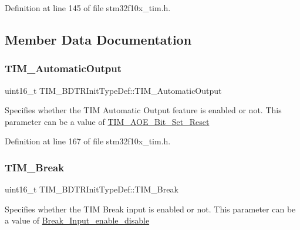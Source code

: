 Definition at line 145 of file stm32f10x\+\_\+tim.\+h.



\subsection{Member Data Documentation}
\mbox{\label{struct_t_i_m___b_d_t_r_init_type_def_a6c056e29af67fd8a32919104ea48eea2}} 
\subsubsection{\texorpdfstring{T\+I\+M\+\_\+\+Automatic\+Output}{TIM\_AutomaticOutput}}
{\footnotesize\ttfamily uint16\+\_\+t T\+I\+M\+\_\+\+B\+D\+T\+R\+Init\+Type\+Def\+::\+T\+I\+M\+\_\+\+Automatic\+Output}

Specifies whether the T\+IM Automatic Output feature is enabled or not. This parameter can be a value of \hyperlink{group___t_i_m___a_o_e___bit___set___reset}{T\+I\+M\+\_\+\+A\+O\+E\+\_\+\+Bit\+\_\+\+Set\+\_\+\+Reset} 

Definition at line 167 of file stm32f10x\+\_\+tim.\+h.

\mbox{\label{struct_t_i_m___b_d_t_r_init_type_def_a9fcf20632d0377727476a98f7183be56}} 
\subsubsection{\texorpdfstring{T\+I\+M\+\_\+\+Break}{TIM\_Break}}
{\footnotesize\ttfamily uint16\+\_\+t T\+I\+M\+\_\+\+B\+D\+T\+R\+Init\+Type\+Def\+::\+T\+I\+M\+\_\+\+Break}

Specifies whether the T\+IM Break input is enabled or not. This parameter can be a value of \hyperlink{group___break___input__enable__disable}{Break\+\_\+\+Input\+\_\+enable\+\_\+disable} 

